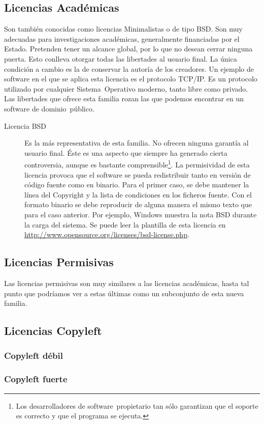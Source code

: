 \subsection{Licencias Académicas}
Son también conocidas como licencias Minimalistas o de tipo BSD. Son
muy adecuadas para investigaciones académicas, generalmente
financiadas por el Estado. Pretenden tener un alcance global, por lo
que no desean cerrar ninguna puerta. Esto conlleva otorgar todas las
libertades al usuario final. La única condición a cambio es la de
conservar la autoría de los creadores. Un ejemplo de software en el
que se aplica esta licencia es el protocolo TCP/IP. Es un protocolo
utilizado por cualquier Sistema~Operativo moderno, tanto libre como
privado. Las libertades que ofrece esta familia rozan las que podemos
encontrar en un software de dominio~público.
\begin{description}
\item[Licencia BSD] Es la más representativa de esta familia. No
  ofrecen ninguna garantía al usuario final. Éste es una aspecto que
  siempre ha generado cierta controversia, aunque es bastante
  comprensible\footnote{Los desarrolladores de software~propietario
    tan sólo garantizan que el soporte es correcto y que el programa
    se ejecuta.}. La permisividad de esta licencia provoca que el
  software se pueda redistribuir tanto en versión de código fuente
  como en binario. Para el primer caso, se debe mantener la línea del
  Copyright y la lista de condiciones en los ficheros fuente. Con el
  formato binario se debe reproducir de alguna manera el mismo texto
  que para el caso anterior. Por ejemplo, Windows muestra la nota BSD
  durante la carga del sistema. Se puede leer la plantilla de esta
  licencia en
  \url{http://www.opensource.org/licenses/bsd-license.php}.
\end{description}

\subsection{Licencias Permisivas}


Las licencias permisivas son muy similares a las licencias académicas,
hasta tal punto que podríamos ver a estas últimas como un subconjunto
de esta nueva familia.

\subsection{Licencias Copyleft}

\subsubsection{Copyleft débil}

\subsubsection{Copyleft fuerte}


